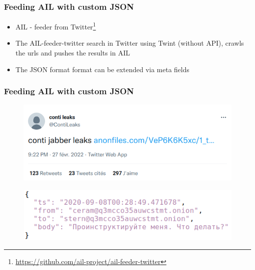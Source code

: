 \begin{frame}[fragile]                                                                                                                        
   \frametitle{Feeding AIL with custom JSON}
        \begin{itemize}
                \item AIL - feeder from Twitter\footnote{\url{https://github.com/ail-project/ail-feeder-twitter}}
                \item The AIL-feeder-twitter search in Twitter using Twint (without API), crawls the urls and pushes the results in AIL
                \item The JSON format format can be extended via meta fields
        \end{itemize}
\end{frame}

\begin{frame}[fragile]
	\frametitle{Feeding AIL with custom JSON}
	\begin{figure}[t]
		\includegraphics[width=.8\textwidth]{screenshot/contileaks-twitter.png}
		\centering
	\end{figure}

	\begin{figure}[t]
		\includegraphics[width=.6\textwidth]{screenshot/contileaks-json.png}
		\centering
	\end{figure}

\end{frame}

